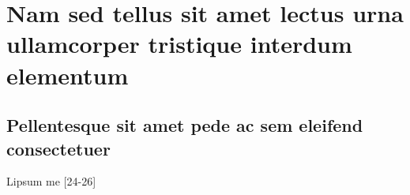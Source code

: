 
\cleardoublepage
{} %

\chapter[Nam sed tellus sit amet lectus]{Nam sed tellus sit amet lectus urna ullamcorper tristique interdum
elementum}

\begin{flushright}
\showfont
\end{flushright}

\newpage



\section[Some encoding tests]{\showfont}
\subsection{\showfont}
\subsubsection{\showfont}
\subsubsubsection{\showfont}


\section{Pellentesque sit amet pede ac sem eleifend consectetuer}

Lipsum me [24-26]
